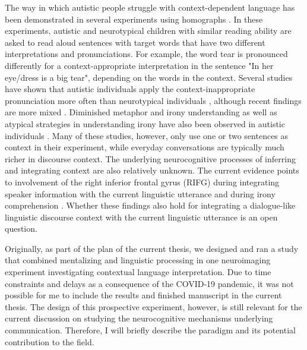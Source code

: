 The way in which autistic people struggle with context-dependent language has been demonstrated in several experiments using homographs \citep{jolliffe1999,happe1997,frith1983,eberhardt2018,hahn2015,brock2008}. In these experiments, autistic and neurotypical children with similar reading ability are asked to read aloud sentences with target words that have two different interpretations and pronunciations. For example, the word tear is pronounced differently for a context-appropriate interpretation in the sentence "In her eye/dress is a big tear", depending on the words in the context. Several studies have shown that autistic individuals apply the context-inappropriate pronunciation more often than neurotypical individuals \citep{jolliffe1999,happe1997,frith1983}, although recent findings are more mixed \citep{eberhardt2018,hahn2015,brock2008}. Diminished metaphor and irony understanding as well as atypical strategies in understanding irony have also been observed in autistic individuals \citep{pexman2011,rundblad2010,deliens2018}. Many of these studies, however, only use one or two sentences as context in their experiment, while everyday conversations are typically much richer in discourse context. The underlying neurocognitive processes of inferring and integrating context are also relatively unknown. The current evidence points to involvement of the right inferior frontal gyrus (RIFG) during integrating speaker information with the current linguistic utterance and during irony comprehension \citep{tesink2009brain,wang2006}. Whether these findings also hold for integrating a dialogue-like linguistic discourse context with the current linguistic utterance is an open question. 

Originally, as part of the plan of the current thesis, we designed and ran a study that combined mentalizing and linguistic processing in one neuroimaging experiment investigating contextual language interpretation. Due to time constraints and delays as a consequence of the COVID-19 pandemic, it was not possible for me to include the results and finished manuscript in the current thesis. The design of this prospective experiment, however, is still relevant for the current discussion on studying the neurocognitive mechanisms underlying communication. Therefore, I will briefly describe the paradigm and its potential contribution to the field.
 
